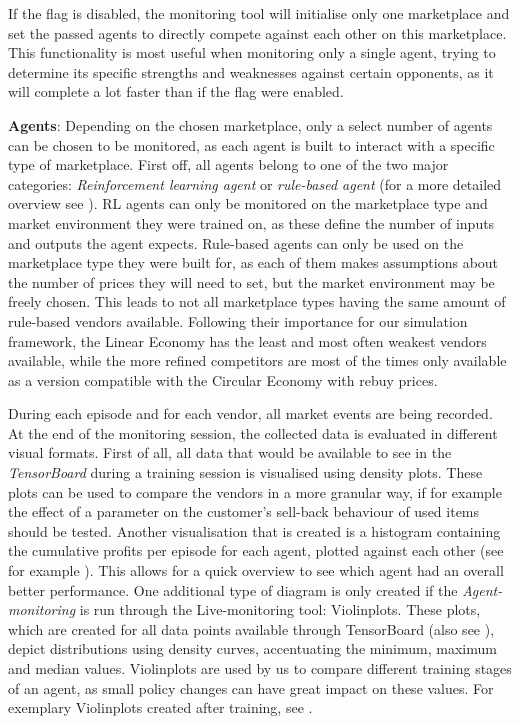If the flag is disabled, the monitoring tool will initialise only one marketplace and set the passed agents to directly compete against each other on this marketplace. This functionality is most useful when monitoring only a single agent, trying to determine its specific strengths and weaknesses against certain opponents, as it will complete a lot faster than if the flag were enabled.

\medskip
\noindent\textbf{Agents}: Depending on the chosen marketplace, only a select number of agents can be chosen to be monitored, as each agent is built to interact with a specific type of marketplace. First off, all agents belong to one of the two major categories: \emph{Reinforcement learning agent} or \emph{rule-based agent} (for a more detailed overview see ). RL agents can only be monitored on the marketplace type and market environment they were trained on, as these define the number of inputs and outputs the agent expects. Rule-based agents can only be used on the marketplace type they were built for, as each of them makes assumptions about the number of prices they will need to set, but the market environment may be freely chosen. This leads to not all marketplace types having the same amount of rule-based vendors available. Following their importance for our simulation framework, the Linear Economy has the least and most often weakest vendors available, while the more refined competitors are most of the times only available as a version compatible with the Circular Economy with rebuy prices.

\medskip
During each episode and for each vendor, all market events are being recorded. At the end of the monitoring session, the collected data is evaluated in different visual formats. First of all, all data that would be available to see in the \emph{TensorBoard} during a training session is visualised using density plots. These plots can be used to compare the vendors in a more granular way, if for example the effect of a parameter on the customer's sell-back behaviour of used items should be tested. Another visualisation that is created is a histogram containing the cumulative profits per episode for each agent, plotted against each other (see for example ). This allows for a quick overview to see which agent had an overall better performance. One additional type of diagram is only created if the \emph{Agent-monitoring} is run through the Live-monitoring tool: Violinplots. These plots, which are created for all data points available through TensorBoard (also see ), depict distributions using density curves, accentuating the minimum, maximum and median values. Violinplots are used by us to compare different training stages of an agent, as small policy changes can have great impact on these values. For exemplary Violinplots created after training, see .

